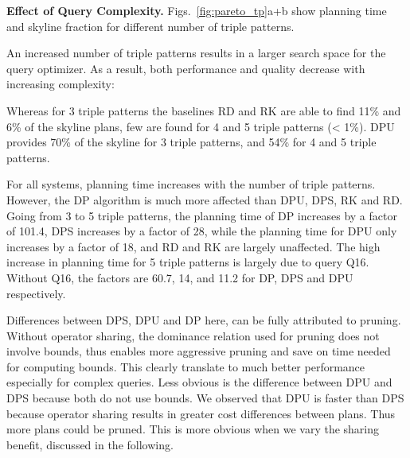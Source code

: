 \textbf{Effect of Query Complexity.} Figs.~\ref{fig:pareto_tp}a+b show 
planning time and skyline fraction for different number of triple patterns. 

An increased number of triple
patterns results in a larger search space for the query optimizer. As a result, both performance and quality decrease with increasing complexity: 

Whereas for 3 triple patterns the baselines RD and RK are able to find 11\% and 6\% of the skyline plans, few
are found for 4 and 5 triple patterns (< 1\%). DPU provides 
70\% of the skyline for 3 triple patterns, and 54\% for 4 and 5 triple patterns. 


For all systems, planning time increases with the number of triple
patterns. However, the DP algorithm is much more affected than DPU,
DPS, RK and RD. Going from 3 to 5 triple patterns, the planning time
of DP increases by a factor of 101.4, DPS increases by a factor of 28,
while the planning time for DPU only increases by a factor of 18, and
RD and RK are largely unaffected. The high increase in planning time
for 5 triple patterns is largely due to query Q16. Without Q16, the
factors are 60.7, 14, and 11.2 for DP, DPS and DPU respectively.

Differences between DPS, DPU and DP here, can be fully attributed to pruning. Without operator sharing, the dominance relation used for pruning does not involve bounds, thus enables more aggressive pruning and save on time needed for computing bounds. This clearly translate to much better performance especially for complex queries. Less obvious is the difference between DPU and DPS because both do not use bounds. We observed that DPU is faster than DPS because operator sharing results in greater cost differences between plans. Thus more plans could be pruned. This is more obvious when we vary the sharing benefit, discussed in the following.  



